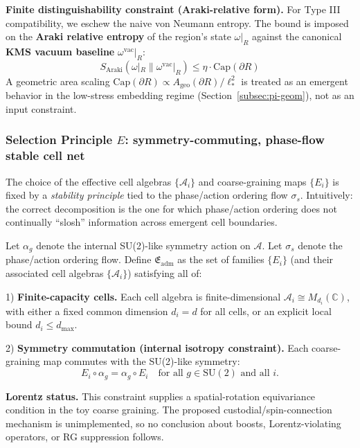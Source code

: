 \documentclass[reprint, amsmath, amssymb, aps, prd]{revtex4-2}
\begin{document}
\textbf{Finite distinguishability constraint (Araki-relative form).}
For Type III compatibility, we eschew the naive von Neumann entropy. The bound is imposed on the \textbf{Araki relative entropy} of the region's state $\omega|_R$ against the canonical \textbf{KMS vacuum baseline} $\omega^{\text{vac}}|_R$:
\begin{equation}
S_{\text{Araki}}( \omega|_R \| \omega^{\text{vac}}|_R ) \leq \eta \cdot \mathrm{Cap}(\partial R)
\end{equation}
A geometric area scaling $\mathrm{Cap}(\partial R) \propto A_{\text{geo}}(\partial R)/\ell_*^2$ is treated as an emergent behavior in the low-stress embedding regime (Section~\ref{subsec:pi-geom}), not as an input constraint.

\subsubsection*{Selection Principle \texorpdfstring{$E$}{E}: symmetry-commuting, phase-flow stable cell net}
The choice of the effective cell algebras $\{\mathcal{A}_i\}$ and coarse-graining maps $\{E_i\}$ is fixed by a \textit{stability principle} tied to the phase/action ordering flow $\sigma_s$. Intuitively: the correct decomposition is the one for which phase/action ordering does not continually ``slosh'' information across emergent cell boundaries.

Let $\alpha_g$ denote the internal SU(2)-like symmetry action on $\mathcal{A}$. Let $\sigma_s$ denote the phase/action ordering flow. Define $\mathfrak{E}_{\text{adm}}$ as the set of families $\{E_i\}$ (and their associated cell algebras $\{\mathcal{A}_i\}$) satisfying all of:

1) \textbf{Finite-capacity cells.} Each cell algebra is finite-dimensional $\mathcal{A}_i \cong M_{d_i}(\mathbb{C})$, with either a fixed common dimension $d_i = d$ for all cells, or an explicit local bound $d_i \leq d_{\max}$. 

2) \textbf{Symmetry commutation (internal isotropy constraint).} Each coarse-graining map commutes with the SU(2)-like symmetry:
\begin{equation}
E_i \circ \alpha_g = \alpha_g \circ E_i \quad \text{for all } g \in \text{SU}(2) \text{ and all } i.
\end{equation}

\textbf{Lorentz status.} This constraint supplies a spatial-rotation equivariance condition in the toy coarse graining. The proposed custodial/spin-connection mechanism is unimplemented, so no conclusion about boosts, Lorentz-violating operators, or RG suppression follows.
\end{document}

